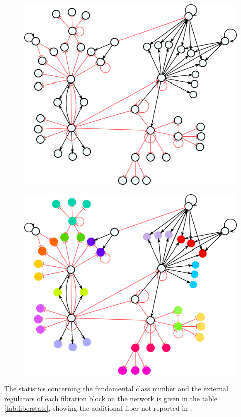 \documentclass[12pt]{diazessay} %
\begin{document}
\begin{figure}[H]
	\centering
	\includegraphics[scale=0.23]{Figures/result3.png}
	\caption{}
	\label{fig:result3}
\end{figure}
\begin{figure}[H]
	\centering
	\includegraphics[scale=0.23]{Figures/result3-1.png}
	\caption{}
	\label{fig:result3-1}
\end{figure}



The statistics concerning the fundamental class number and the external regulators of each fibration block on the network is given in the table \ref{tab:fiberstats}, showing the additional fiber not reported in \cite{fibration2019}. 
\end{document}
